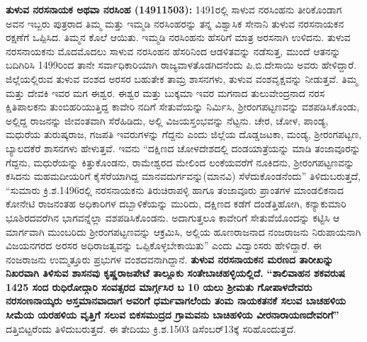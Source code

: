 \textbf{ತುಳುವ ನರಸನಾಯಕ ಅಥವಾ ನರಸಿಂಹ (14911503): } 1491ರಲ್ಲಿ ಸಾಳುವ ನರಸಿಂಹನು ತೀರಿಕೊಂಡಾಗ ಅವನ ಇಬ್ಬರು ಪುತ್ರರಾದ ತಿಮ್ಮ ಮತ್ತು ಇಮ್ಮಡಿ ನರಸಿಂಹರನ್ನು ತನ್ನ ವಿಶ್ವಾಸಿಕ ಸೇನಾನಿ ತುಳುವ ನರಸನಾಯಕನ ರಕ್ಷಣೆಗೆ ಒಪ್ಪಿಸಿದ. ತಿಮ್ಮನ ಕೊಲೆ ಆಯಿತು. ಇಮ್ಮಡಿ ನರಸಿಂಹನು ಹೆಸರಿಗೆ ಮಾತ್ರ ಅರಸನಾಗಿ ಉಳಿದನು. ತುಳುವ ನರಸನಾಯಕನು ಮೊದಮೊದಲು ಸಾಳುವ ನರಸಿಂಹನ ಹೆಸರಿನಿಂದ ಆಡಳಿತವನ್ನು ನಡೆಸುತ್ತ, ಮುಂದೆ ಆತನನ್ನು ಬದಿಗಿರಿಸಿ 1499ರಿಂದ ತಾನೇ ಸರ್ವಾಧಿಕಾರಿಯಾಗಿ ರಾಜ್ಯವಾಳತೊಡಗಿದನೆಂದು ಪಿ.ಬಿ.ದೇಸಾಯಿ ಅವರು ಹೇಳಿದ್ದಾರೆ. ಜಿಲ್ಲೆಯಲ್ಲಿರುವ ತುಳುವ ವಂಶದ ಅರಸರ ಬಹುತೇಕ ತಾಮ್ರ ಶಾಸನಗಳು, ತುಳುವ ವಂಶವೃಕ್ಷವನ್ನು ನೀಡುತ್ತವೆ. ತಿಮ್ಮ ಮತ್ತು ದೇವಕಿ ಇವರ ಮಗ ಈಶ್ವರ. ಈಶ್ವರ ಮತ್ತು ಬುಕ್ಕಮಾ ಇವರ ಮಗನಾದ ತುಲುವೇಂದ್ರನಾದ ನರಸ ಕ್ಷಿತಿಪಾಲಕನು ತುಂಬಿಹರಿಯುತ್ತಿದ್ದ ಕಾವೇರಿ ನದಿಗೆ ಸೇತುವೆಯನ್ನು ನಿರ್ಮಿಸಿ, ಶ‍್ರೀರಂಗಪಟ್ಟಣವನ್ನು ವಶಪಡಿಸಿಕೊಂಡು, ಅಲ್ಲಿದ್ದ ರಾಜನನ್ನು ಜೀವಂತವಾಗಿ ಸೆರೆಹಿಡಿದು, ಅಲ್ಲಿ ವಿಜಯಸ್ತಂಭವನ್ನು ನೆಟ್ಟನು. ಚೇರ, ಚೋಳ, ಪಾಂಡ್ಯ, ಮಧುರೆಯ ತುರುಷ್ಕರಾಜ, ಗಜಪತಿ ಇವರುಗಳನ್ನು ಗೆದ್ದನು ಎಂದು ಜಿಲ್ಲೆಯ ದೊಡ್ಡಜಟಕಾ, ಮಂಡ್ಯ, ಶ‍್ರೀರಂಗಪಟ್ಟಣ, ಬ್ಯಾಲದಕೆರೆ ಶಾಸನಗಳು ಹೇಳುತ್ತವೆ. ಇವನು “ದಕ್ಷಿಣದ ಚೋಳದೇಶದಲ್ಲಿ ದಂಡಯಾತ್ರೆಯನ್ನು ಮಾಡಿ ತಂಜಾವೂರನ್ನು ಗೆದ್ದನು, ಮಧುರೆಯನ್ನು ಕಿತ್ತುಕೊಂಡನು, ರಾಮೇಶ್ವರದ ಮೇಲಿಂದ ಲಂಕೆಯವರೆಗೆ ನೂಕಿದನು, ಶ‍್ರೀರಂಗಪಟ್ಟಣವನ್ನು ಕಸಿದನು ಮಹಮದೀಯರಿಗೆ ಕೈಸೆರೆಯಾಗಿದ್ದ ಮಾನವದುರ್ಗವನ್ನು(ಮಾನವಿ) ಸೆಳೆದುಕೊಂಡನೆಂದು” ತಿಳಿದುಬರುತ್ತದೆ, “ಸುಮಾರು ಕ್ರಿ.ಶ.1496ರಲ್ಲಿ ನರಸನಾಯಕನು ತಿರುಚಿರಾಪಳ್ಳಿ ಹಾಗೂ ತಂಜಾವೂರು ಪ್ರಾಂತಗಳ ಮಾಂಡಲಿಕನಾದ ಕೋನೇಟಿ ರಾಜನಂತಹ ಅಧಿಕಾರಿಗಳ ದಬ್ಬಾಳಿಕೆಯನ್ನು ಮುರಿದು, ದಕ್ಷಿಣದ ಕಡೆಗೆ ದಂಡೆತ್ತಿಹೋಗಿ, ಕನ್ಯಾಕುಮಾರಿ ಭೂಶಿರದವರೆಗಿನ ಭಾಗವನ್ನೆಲ್ಲಾ ವಶಪಡಿಸಿಕೊಂಡನು. ಅದಾಗುತ್ತಲೂ ಕಾವೇರಿಗೆ ಸೇತುವೆಯೊಂದನ್ನು ಕಟ್ಟಿಸಿ ಆ ಮಾರ್ಗವಾಗಿ ಮುಂಬರಿದು ಶ‍್ರೀರಂಗಪಟ್ಟಣವನ್ನು ಆಕ್ರಮಿಸಿ, ಅಲ್ಲಿಯ ಹೂಣರಾಜನಾದ ನಂಜರಾಜನು ನಿರುಪಾಯನಾಗಿ ವಿಜಯನಗರದ ಅರಸರ ಅಧಿರಾಜತ್ವವನ್ನು ಒಪ್ಪಿಕೊಳ್ಳಬೇಕಾಯಿತು” ಎಂದು ವಿದ್ವಾಂಸರು ಹೇಳಿದ್ದಾರೆ. ಈ ನಂಜರಾಜನು ಉಮ್ಮತ್ತೂರು ಪ್ರಭುಗಳ ವಂಶದವನಾಗಿದ್ದಾನೆ. \textbf{ತುಳುವ ನರಸನಾಯಕನ ಮರಣದ ತಾರೀಖನ್ನು ನಿಖರವಾಗಿ ತಿಳಿಸುವ ಶಾಸನವು ಕೃಷ್ಣರಾಜಪೇಟೆ ತಾಲ್ಲೂಕು ಸಂತೇಬಾಚಹಳ್ಳಿಯಲ್ಲಿದೆ.} \textbf{“ಶಾಲಿವಾಹನ ಶಕವರುಷ 1425 ಸಂದ ರುಧಿರೋದ್ಗಾರಿ ಸಂವತ್ಸರದ ಮಾರ್ಗ್ಗಸಿರ ಬ 10 ಯಲು ಶ‍್ರೀಮತು ಗೋಪಾಳದೇವರು ನರಸಂಣನಾಯ್ಕರು ಅಸ್ತಮಾನವಾದಾಗ ಅವರಿಗೆ ಧರ್ಮವಾಗಲೆಂದು ತಂಮ ನಾಯಕತನಕೆ ಸಲುವ ಬಾಚಹಳಿಯ ಸೀಮೆಯ ಯರಹಳಿಯ ವೃತ್ತಿಗೆ ಸಲುವ ಬಿಕಸಮುದ್ರದ ಗ್ರಾಮವನು ಬಾಚಿಹಳಿಯ ವೀರನಾರಾಯಣದೇವರಿಗೆ”} ದತ್ತಿಬಿಟ್ಟರೆಂದು ತಿಳಿದುಬರುತ್ತದೆ. ಈ ತೇದಿಯು ಕ್ರಿ.ಶ.1503 ಡಿಸೆಂಬರ್​ 13ಕ್ಕೆ ಸರಿಹೊಂದುತ್ತದೆ.

